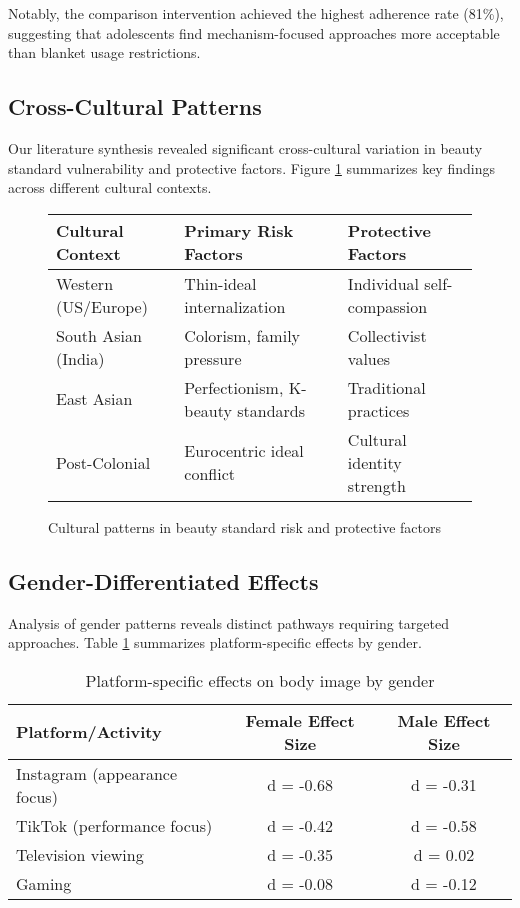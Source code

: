 \documentclass{article}
\begin{document}
Notably, the comparison intervention achieved the highest adherence rate (81\%), suggesting that adolescents find mechanism-focused approaches more acceptable than blanket usage restrictions.

\subsection{Cross-Cultural Patterns}

Our literature synthesis revealed significant cross-cultural variation in beauty standard vulnerability and protective factors. Figure \ref{fig:cultural-patterns} summarizes key findings across different cultural contexts.

\begin{figure}[t]
\centering
\begin{tabular}{|l|l|l|}
\hline
\textbf{Cultural Context} & \textbf{Primary Risk Factors} & \textbf{Protective Factors} \\
\hline
Western (US/Europe) & Thin-ideal internalization & Individual self-compassion \\
South Asian (India) & Colorism, family pressure & Collectivist values \\
East Asian & Perfectionism, K-beauty standards & Traditional practices \\
Post-Colonial & Eurocentric ideal conflict & Cultural identity strength \\
\hline
\end{tabular}
\caption{Cultural patterns in beauty standard risk and protective factors}
\label{fig:cultural-patterns}
\end{figure}

\subsection{Gender-Differentiated Effects}

Analysis of gender patterns reveals distinct pathways requiring targeted approaches. Table \ref{tab:gender-effects} summarizes platform-specific effects by gender.

\begin{table}[t]
\caption{Platform-specific effects on body image by gender}
\label{tab:gender-effects}
\centering
\begin{tabular}{lcc}
\toprule
Platform/Activity & Female Effect Size & Male Effect Size \\
\midrule
Instagram (appearance focus) & d = -0.68 & d = -0.31 \\
TikTok (performance focus) & d = -0.42 & d = -0.58 \\
Television viewing & d = -0.35 & d = 0.02 \\
Gaming & d = -0.08 & d = -0.12 \\
\bottomrule
\end{tabular}
\end{table}
\end{document}

